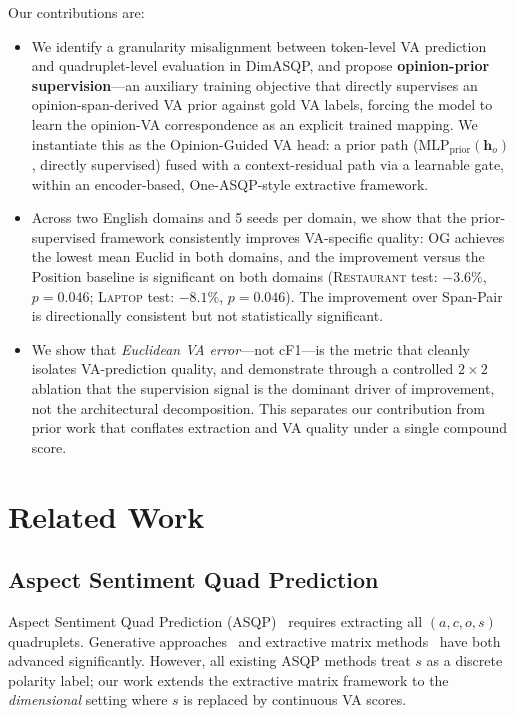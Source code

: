 \documentclass[runningheads]{llncs}
\newcommand{\restaurant}{{\normalfont\textsc{Restaurant}}}
\newcommand{\laptop}{{\normalfont\textsc{Laptop}}}
\begin{document}
Our contributions are:
\begin{itemize}
    \item We identify a granularity misalignment between token-level VA prediction and quadruplet-level evaluation in DimASQP, and propose \textbf{opinion-prior supervision}---an auxiliary training objective that directly supervises an opinion-span-derived VA prior against gold VA labels, forcing the model to learn the opinion-VA correspondence as an explicit trained mapping. We instantiate this as the Opinion-Guided VA head: a prior path ($\text{MLP}_{\text{prior}}(\mathbf{h}_o)$, directly supervised) fused with a context-residual path via a learnable gate, within an encoder-based, One-ASQP-style extractive framework.
    \item Across two English domains and 5 seeds per domain, we show that the prior-supervised framework consistently improves VA-specific quality: OG achieves the lowest mean Euclid in both domains, and the improvement versus the Position baseline is significant on both domains (\restaurant{} test: $-3.6\%$, $p = 0.046$; \laptop{} test: $-8.1\%$, $p = 0.046$). The improvement over Span-Pair is directionally consistent but not statistically significant.
    \item We show that \emph{Euclidean VA error}---not cF1---is the metric that cleanly isolates VA-prediction quality, and demonstrate through a controlled $2\!\times\!2$ ablation that the supervision signal is the dominant driver of improvement, not the architectural decomposition. This separates our contribution from prior work that conflates extraction and VA quality under a single compound score.
\end{itemize}

\section{Related Work}
\label{sec:related}

\subsection{Aspect Sentiment Quad Prediction}

Aspect Sentiment Quad Prediction (ASQP)~\cite{cai2021acos} requires extracting all $(a, c, o, s)$ quadruplets. Generative approaches~\cite{zhang2021paraphrase,zhang2021generative,mao2022seq2path,gou2023mvp,bai2024bvsp} and extractive matrix methods~\cite{gao2023oneasqp,su2025gridtag,zhou2024spanpair} have both advanced significantly. However, all existing ASQP methods treat $s$ as a discrete polarity label; our work extends the extractive matrix framework to the \emph{dimensional} setting where $s$ is replaced by continuous VA scores.
\end{document}
